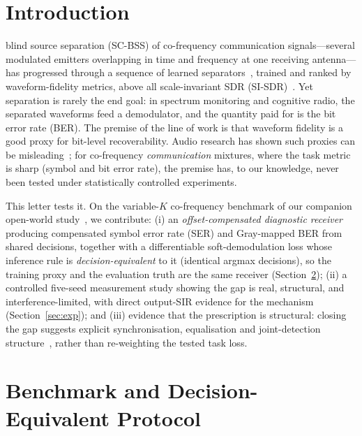 \documentclass[journal]{IEEEtran}
\begin{document}
\section{Introduction}
\label{sec:intro}

 blind source separation (SC-BSS) of
co-frequency communication signals---several modulated emitters
overlapping in time and frequency at one receiving antenna---has
progressed through a sequence of learned
separators~\cite{hou2022single,chen2019deep,ma2023novel,luo2023single,guo2024single},
trained and ranked by waveform-fidelity metrics, above all
scale-invariant SDR (SI-SDR)~\cite{kolbaek2017pit,leroux2019sdr}. Yet
separation is rarely the end goal: in spectrum monitoring and cognitive
radio, the separated waveforms feed a demodulator, and the quantity
paid for is the bit error rate (BER). The premise of the line of work
is that waveform fidelity is a good proxy for bit-level recoverability.
Audio research has shown such proxies can be
misleading~\cite{vincent2006bsseval,leroux2019sdr}; for co-frequency
\emph{communication} mixtures, where the task metric is sharp (symbol
and bit error rate), the premise has, to our knowledge, never been
tested under statistically controlled experiments.

This letter tests it. On the variable-$K$ co-frequency benchmark of our
companion open-world study~\cite{nong2026openworld}, we contribute: (i)
an \emph{offset-compensated diagnostic receiver} producing compensated
symbol error rate (SER) and Gray-mapped BER from shared decisions,
together with a differentiable soft-demodulation loss whose inference
rule is \emph{decision-equivalent} to it (identical argmax decisions),
so the training proxy and the evaluation truth are the same receiver
(Section~\ref{sec:protocol}); (ii) a controlled five-seed measurement
study showing the gap is real, structural, and interference-limited,
with direct output-SIR evidence for the mechanism
(Section~\ref{sec:exp}); and (iii) evidence that the prescription is
structural: closing the gap suggests explicit synchronisation,
equalisation and joint-detection
structure~\cite{verdu1998multiuser,dankberg1998pcma,andrews2005interference},
rather than re-weighting the tested task loss.

\section{Benchmark and Decision-Equivalent Protocol}
\label{sec:protocol}
\end{document}

